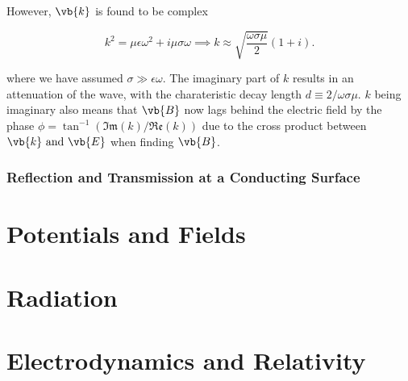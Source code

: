 \documentclass[english,a4paper,12pt]{report}
\begin{document}
However, \(\vb{k} \) is found to be complex

\begin{equation}
    k^2 = \mu \epsilon \omega ^2 + i\mu \sigma \omega \implies k \approx \sqrt{\frac{\omega \sigma \mu }{2} } (1+i). 
\end{equation}

where we have assumed \(\sigma \gg \epsilon \omega \). The imaginary part of \(k\) results in an attenuation of the wave, with the charateristic decay length \(d \equiv 2 /\omega \sigma \mu  \). \(k\) being imaginary also means that \(\vb{B} \) now lags behind the electric field by the phase \(\phi = \tan ^{-1} (\mathfrak{Im} (k)/\mathfrak{Re} (k))\) due to the cross product between \(\vb{k} \text { and } \vb{E} \) when finding \(\vb{B} \). 

\subsection{Reflection and Transmission at a Conducting Surface}










\chapter{Potentials and Fields}


\chapter{Radiation}

\chapter{Electrodynamics and Relativity}
\end{document}
